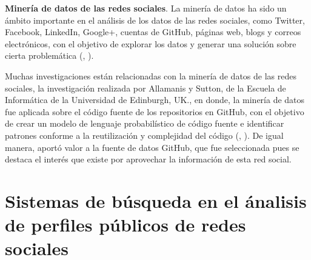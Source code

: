 \textbf{Minería de datos de las redes sociales}.
La minería de datos ha sido un ámbito importante en el análisis de los datos de las redes sociales, como Twitter, Facebook, LinkedIn, Google+, cuentas de GitHub, páginas web, blogs y correos electrónicos, con el objetivo de explorar los datos y generar una solución sobre cierta problemática (\citeauthor{book_miningsocial}, \citeyear{book_miningsocial}).

Muchas investigaciones están relacionadas con la minería de datos de las redes sociales, la investigación realizada por Allamanis y Sutton, de la Escuela de Informática de la Universidad de Edinburgh, UK., en donde, la minería de datos fue aplicada sobre el código fuente de los repositorios en GitHub, con el objetivo de crear un modelo de lenguaje probabilístico de código fuente e identificar patrones conforme a la reutilización y complejidad del código (\citeauthor{art_mininggithub}, \citeyear{art_mininggithub}). De igual manera, aportó valor a la fuente de datos GitHub, que fue seleccionada pues se destaca el interés que existe por aprovechar la información de esta red social.

%
%
%


\section{Sistemas de búsqueda en el ánalisis de perfiles públicos de redes sociales}
% 
% 
% 

